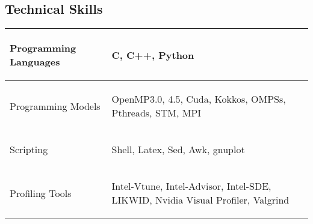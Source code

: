 \documentclass[margin]{res}
\begin{document}
\begin{resume}
\section{Technical Skills}
%
    \begin{center}
        \begin{tabular} {|p{3cm} || p{7cm}| } \hline
%
            \begin{center}Programming Languages \end{center} & \begin{center} C, C++, Python \end{center} \\ \hline
%
            \begin{center} Programming Models \end{center} & \begin{center} OpenMP{3.0, 4.5}, Cuda, Kokkos, OMPSs, Pthreads, STM, MPI \end{center} \\ \hline
%
            \begin{center} Scripting \end{center} & \begin{center} Shell, Latex, Sed, Awk, gnuplot \end{center} \\ \hline
%
                \begin{center} Profiling Tools \end{center} & \begin{center} Intel-Vtune, Intel-Advisor, Intel-SDE, LIKWID, Nvidia Visual Profiler, Valgrind \end{center} \\ \hline
        \end{tabular}
    \end{center}
%

\end{resume}
\end{document}
